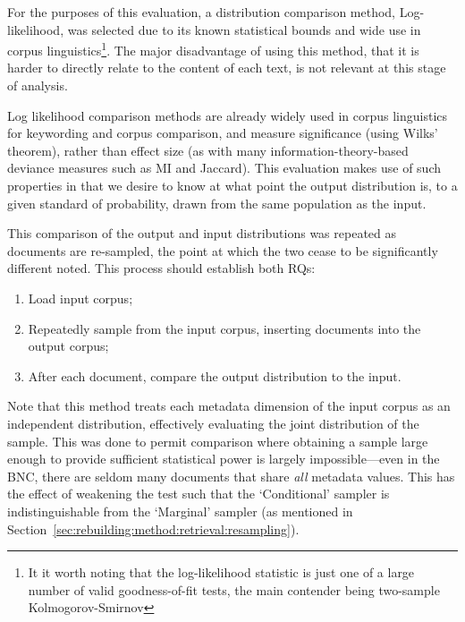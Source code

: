 For the purposes of this evaluation, a distribution comparison method, Log-likelihood, was selected due to its known statistical bounds and wide use in corpus linguistics\footnote{It it worth noting that the log-likelihood statistic is just one of a large number of valid goodness-of-fit tests, the main contender being two-sample Kolmogorov-Smirnov}.  The major disadvantage of using this method, that it is harder to directly relate to the content of each text, is not relevant at this stage of analysis.


Log likelihood comparison methods are already widely used in corpus linguistics for keywording and corpus comparison, and measure significance (using Wilks' theorem\cite{wilks1938large}), rather than effect size (as with many information-theory-based deviance measures such as MI and Jaccard).  This evaluation makes use of such properties in that we desire to know at what point the output distribution is, to a given standard of probability, drawn from the same population as the input.%

This comparison of the output and input distributions was repeated as documents are re-sampled, the point at which the two cease to be significantly different noted.  This process should establish both RQs:

\begin{enumerate}
    \item Load input corpus;
    \item Repeatedly sample from the input corpus, inserting documents into the output corpus;
    \item After each document, compare the output distribution to the input.
\end{enumerate}


Note that this method treats each metadata dimension of the input corpus as an independent distribution, effectively evaluating the joint distribution of the sample.  This was done to permit comparison where obtaining a sample large enough to provide sufficient statistical power is largely impossible---even in the BNC, there are seldom many documents that share \textsl{all} metadata values.  This has the effect of weakening the test such that the `Conditional' sampler is indistinguishable from the `Marginal' sampler (as mentioned in Section~\ref{sec:rebuilding:method:retrieval:resampling}).



